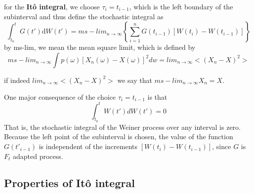 \documentclass[12pt]{report}
\begin{document}
for the \textbf{It\^{o} integral}, we choose $\tau_i=t_{i-1}$, which is the left boundary of the subinterval and thus define the stochastic integral as
\begin{equation*}
\int_{t_0}^{t}G(t')\mathrm{d}W(t')=ms-lim_{n\rightarrow\infty}\left\{\sum_{i=1}^nG(t_{i-1})[W(t_{i})-W(t_{i-1})] \right\}
\end{equation*}
by ms-lim, we mean the mean square limit, which is defined by 
\begin{equation*}
ms-lim_{n\rightarrow\infty}\int p(\omega)[X_n(\omega)-X(\omega)]^2dw= lim_{n\rightarrow \infty}<(X_n-X)^2>
\end{equation*}

if indeed $lim_{n\rightarrow \infty}<(X_n-X)^2>$ we say that $ms-lim_{n\rightarrow \infty} X_n=X$.

One major consequence of the choice $\tau_i=t_{i-1}$ is that 
\begin{equation*}
\int_{t_0}^{t}W(t')dW(t')=0
\end{equation*}
That is, the stochastic integral of the Weiner process over any interval is zero.
Because the left point of the subinterval is chosen, the value of the function $G(t'_{i-1})$ is independent of the increments $[W(t_i)-W(t_{i-1})]$, since $G$ is $F_t$ adapted process.
\subsection{Properties of It\^{o} integral}
\end{document}
